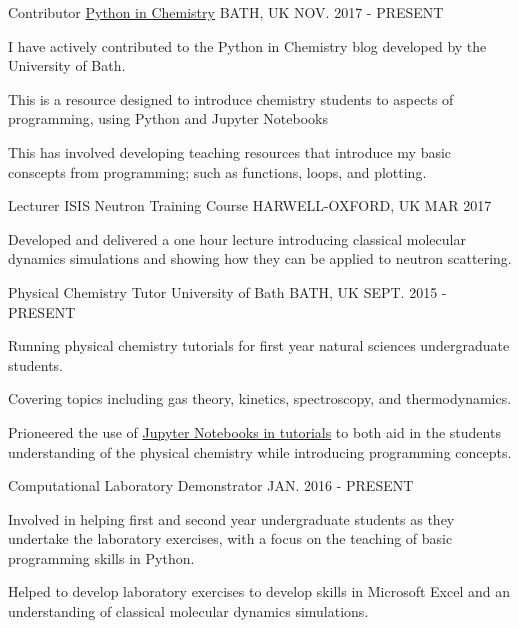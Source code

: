 \begin{cventries}
  \cventry
	{Contributor}
	{\href{http://blogs.bath.ac.uk/python/}{Python in Chemistry}}
	{BATH, UK}
	{NOV. 2017 - PRESENT}
	{
		\begin{cvitems}
		   \item {I have actively contributed to the Python in Chemistry blog developed by the University of Bath.}
		   \item {This is a resource designed to introduce chemistry students to aspects of programming, using Python and Jupyter Notebooks}
		   \item {This has involved developing teaching resources that introduce my basic conscepts from programming; such as functions, loops, and plotting.}
		\end{cvitems}
	}
  \cventry
  	{Lecturer}
    {ISIS Neutron Training Course}
    {HARWELL-OXFORD, UK}
    {MAR 2017}
    {
       \begin{cvitems}
		\item {Developed and delivered a one hour lecture introducing classical molecular dynamics simulations and showing how they can be applied to neutron scattering.}
        \end{cvitems}
    }
  \cventry
    {Physical Chemistry Tutor}
    {University of Bath}
    {BATH, UK}
    {SEPT. 2015 - PRESENT}
    {
      \begin{cvitems}
        \item {Running physical chemistry tutorials for first year natural sciences undergraduate students.}
        \item {Covering topics including gas theory, kinetics, spectroscopy, and thermodynamics.}
        \item {Prioneered the use of \href{http://people.bath.ac.uk/arm61/jupyter_tutorials/}{Jupyter Notebooks in tutorials} to both aid in the students understanding of the physical chemistry while introducing programming concepts.}
      \end{cvitems}
    }
  \cventry
 	{Computational Laboratory Demonstrator}
    {}
    {}
    {JAN. 2016 - PRESENT}
    {
    	\begin{cvitems}
        	\item {Involved in helping first and second year undergraduate students as they undertake the laboratory exercises, with a focus on the teaching of basic programming skills in Python.}
            \item {Helped to develop laboratory exercises to develop skills in Microsoft Excel and an understanding of classical molecular dynamics simulations.}
        \end{cvitems}
    }
\end{cventries}


